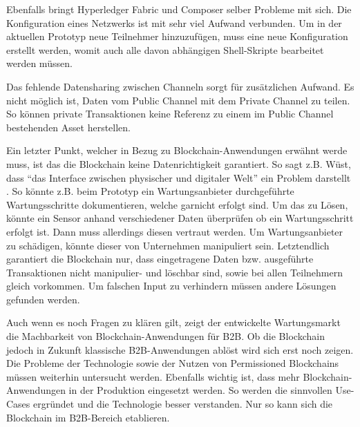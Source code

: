 Ebenfalls bringt Hyperledger Fabric und Composer selber Probleme mit sich. Die Konfiguration eines Netzwerks ist mit sehr viel Aufwand verbunden. Um in der aktuellen Prototyp neue Teilnehmer hinzuzufügen, muss eine neue Konfiguration erstellt werden, womit auch alle davon abhängigen Shell-Skripte bearbeitet werden müssen. 

Das fehlende Datensharing zwischen Channeln sorgt für zusätzlichen Aufwand. Es nicht möglich ist, Daten vom Public Channel mit dem Private Channel zu teilen. So können private Transaktionen keine Referenz zu einem im Public Channel bestehenden Asset herstellen.

Ein letzter Punkt, welcher in Bezug zu Blockchain-Anwendungen erwähnt werde muss, ist das die Blockchain keine Datenrichtigkeit garantiert. So sagt z.B. Wüst, dass ``das Interface zwischen physischer und digitaler Welt'' ein Problem darstellt \cite{WustyouneedBlockchain2017}. So könnte z.B. beim Prototyp ein Wartungsanbieter durchgeführte Wartungsschritte dokumentieren, welche garnicht erfolgt sind. Um das zu Lösen, könnte ein Sensor anhand verschiedener Daten überprüfen ob ein Wartungsschritt erfolgt ist. Dann muss allerdings diesen vertraut werden. Um Wartungsanbieter zu schädigen, könnte dieser von Unternehmen manipuliert sein. Letztendlich garantiert die Blockchain nur, dass eingetragene Daten bzw. ausgeführte Transaktionen nicht manipulier- und löschbar sind, sowie bei allen Teilnehmern gleich vorkommen. Um falschen Input zu verhindern müssen andere Lösungen gefunden werden.

Auch wenn es noch Fragen zu klären gilt, zeigt der entwickelte Wartungsmarkt die Machbarkeit von Blockchain-Anwendungen für B2B. Ob die Blockchain jedoch in Zukunft klassische B2B-Anwendungen ablöst wird sich erst noch zeigen. Die Probleme der Technologie sowie der Nutzen von Permissioned Blockchains müssen weiterhin untersucht werden. Ebenfalls wichtig ist, dass mehr Blockchain-Anwendungen in der Produktion eingesetzt werden. So werden die sinnvollen Use-Cases ergründet und die Technologie besser verstanden. Nur so kann sich die Blockchain im B2B-Bereich etablieren.






